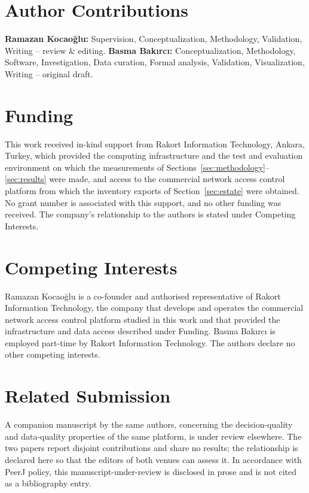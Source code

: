 \documentclass[fleqn,10pt,lineno]{wlpeerj}
\begin{document}
\section*{Author Contributions}
\textbf{Ramazan Kocaoğlu:} Supervision, Conceptualization, Methodology, Validation, Writing -- review \& editing. \textbf{Basma Bakırcı:} Conceptualization, Methodology, Software, Investigation, Data curation, Formal analysis, Validation, Visualization, Writing -- original draft.

\section*{Funding}
This work received in-kind support from Rakort Information Technology, Ankara, Turkey, which provided the computing infrastructure and the test and evaluation environment on which the measurements of Sections~\ref{sec:methodology}--\ref{sec:results} were made, and access to the commercial network access control platform from which the inventory exports of Section~\ref{sec:estate} were obtained. No grant number is associated with this support, and no other funding was received. The company's relationship to the authors is stated under Competing Interests.

\section*{Competing Interests}
Ramazan Kocaoğlu is a co-founder and authorised representative of Rakort Information Technology, the company that develops and operates the commercial network access control platform studied in this work and that provided the infrastructure and data access described under Funding. Basma Bakırcı is employed part-time by Rakort Information Technology. The authors declare no other competing interests.

\section*{Related Submission}
A companion manuscript by the same authors, concerning the decision-quality and data-quality properties of the same platform, is under review elsewhere. The two papers report disjoint contributions and share no results; the relationship is declared here so that the editors of both venues can assess it. In accordance with PeerJ policy, this manuscript-under-review is disclosed in prose and is not cited as a bibliography entry.
\end{document}
